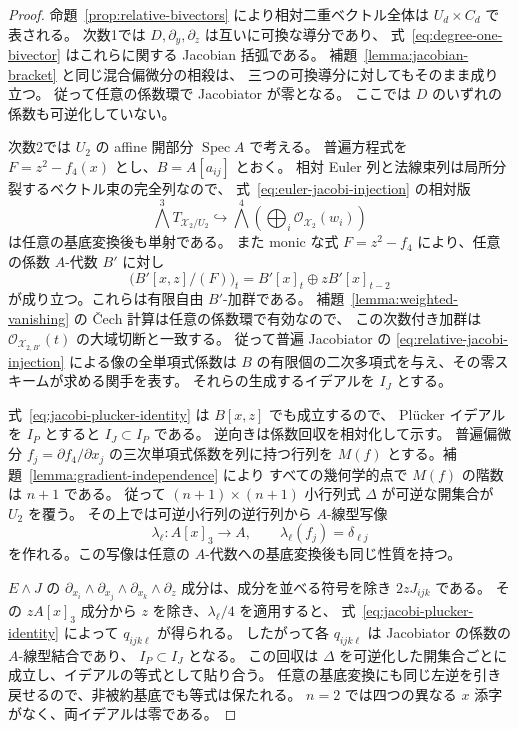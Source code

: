 \begin{proof}
命題~\ref{prop:relative-bivectors} により相対二重ベクトル全体は
$U_d\times C_d$ で表される。
次数1では $D,\partial_y,\partial_z$ は互いに可換な導分であり、
式~\eqref{eq:degree-one-bivector} はこれらに関する Jacobian 括弧である。
補題~\ref{lemma:jacobian-bracket} と同じ混合偏微分の相殺は、
三つの可換導分に対してもそのまま成り立つ。
従って任意の係数環で Jacobiator が零となる。
ここでは $D$ のいずれの係数も可逆化していない。

次数2では $U_2$ の affine 開部分 $\operatorname{Spec}A$ で考える。
普遍方程式を $F=z^2-f_4(x)$ とし、$B=A[a_{ij}]$ とおく。
相対 Euler 列と法線束列は局所分裂するベクトル束の完全列なので、
式~\eqref{eq:euler-jacobi-injection} の相対版
\begin{equation}
 \bigwedge^3T_{\mathcal X_2/U_2}
 \hookrightarrow\bigwedge^4
       \left(\bigoplus_i\mathcal O_{\mathcal X_2}(w_i)\right)
 \label{eq:relative-jacobi-injection}
\end{equation}
は任意の基底変換後も単射である。
また monic な式 $F=z^2-f_4$ により、任意の係数 $A$-代数 $B'$ に対し
\[
 \bigl(B'[x,z]/(F)\bigr)_t
   =B'[x]_t\oplus zB'[x]_{t-2}
\]
が成り立つ。これらは有限自由 $B'$-加群である。
補題~\ref{lemma:weighted-vanishing} の \v Cech 計算は任意の係数環で有効なので、
この次数付き加群は $\mathcal O_{\mathcal X_{2,B'}}(t)$ の大域切断と一致する。
従って普遍 Jacobiator の
\eqref{eq:relative-jacobi-injection} による像の全単項式係数は
$B$ の有限個の二次多項式を与え、その零スキームが求める関手を表す。
それらの生成するイデアルを $I_J$ とする。

式~\eqref{eq:jacobi-plucker-identity} は $B[x,z]$ でも成立するので、
Pl\"ucker イデアルを $I_P$ とすると $I_J\subset I_P$ である。
逆向きは係数回収を相対化して示す。
普遍偏微分 $f_j=\partial f_4/\partial x_j$ の三次単項式係数を列に持つ行列を
$M(f)$ とする。補題~\ref{lemma:gradient-independence} により
すべての幾何学的点で $M(f)$ の階数は $n+1$ である。
従って $(n+1)\times(n+1)$ 小行列式 $\Delta$ が可逆な開集合が $U_2$ を覆う。
その上では可逆小行列の逆行列から $A$-線型写像
\[
 \lambda_\ell:A[x]_3\longrightarrow A,
 \qquad\lambda_\ell(f_j)=\delta_{\ell j}
\]
を作れる。この写像は任意の $A$-代数への基底変換後も同じ性質を持つ。

$E\wedge J$ の
$\partial_{x_i}\wedge\partial_{x_j}\wedge\partial_{x_k}\wedge\partial_z$
成分は、成分を並べる符号を除き $2zJ_{ijk}$ である。
その $zA[x]_3$ 成分から $z$ を除き、$\lambda_\ell/4$ を適用すると、
式~\eqref{eq:jacobi-plucker-identity} によって $q_{ijk\ell}$ が得られる。
したがって各 $q_{ijk\ell}$ は Jacobiator の係数の $A$-線型結合であり、
$I_P\subset I_J$ となる。
この回収は $\Delta$ を可逆化した開集合ごとに成立し、イデアルの等式として貼り合う。
任意の基底変換にも同じ左逆を引き戻せるので、非被約基底でも等式は保たれる。
$n=2$ では四つの異なる $x$ 添字がなく、両イデアルは零である。
\end{proof}

